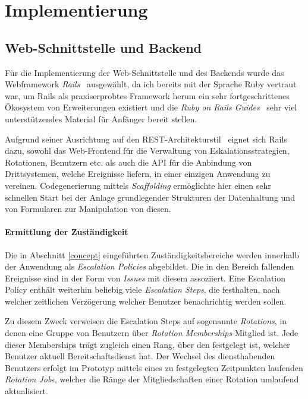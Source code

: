 \documentclass[11pt,utf8,notoc,bibnum,german,final]{zihpub}
\begin{document}
\section{Implementierung}

\subsection{Web-Schnittstelle und Backend}

Für die Implementierung der Web-Schnittstelle und des Backends wurde das
Webframework \emph{Rails}~\cite{rails} ausgewählt, da ich bereits mit der Sprache
Ruby vertraut war, um Rails als praxiserprobtes Framework herum ein sehr
fortgeschrittenes Ökosystem von Erweiterungen existiert und die \emph{Ruby on Rails
Guides}~\cite{rails-guides} sehr viel unterstützendes Material für Anfänger
bereit stellen.

Aufgrund seiner Ausrichtung auf den REST-Architekturstil~\cite{fielding-rest}
eignet sich Rails dazu, sowohl das Web-Frontend für die Verwaltung von
Eskalationsstrategien, Rotationen, Benutzern etc. als auch die API für die
Anbindung von Drittsystemen, welche Ereignisse liefern, in einer einzigen
Anwendung zu vereinen. Codegenerierung mittels \emph{Scaffolding} ermöglichte
hier einen sehr schnellen Start bei der Anlage grundlegender Strukturen der
Datenhaltung und von Formularen zur Manipulation von diesen.

\paragraph{Ermittlung der Zuständigkeit}

Die in Abschnitt \ref{concept} eingeführten Zuständigkeitsbereiche werden
innerhalb der Anwendung als \emph{Escalation Policies} abgebildet. Die in den
Bereich fallenden Ereignisse sind in der Form von \emph{Issues} mit diesem
assoziiert. Eine Escalation Policy enthält weiterhin beliebig viele
\emph{Escalation Steps}, die festhalten, nach welcher zeitlichen Verzögerung
welcher Benutzer benachrichtig werden sollen.

Zu diesem Zweck verweisen die Escalation Steps auf sogenannte \emph{Rotations},
in denen eine Gruppe von Benutzern über \emph{Rotation Memberships} Mitglied
ist. Jede dieser Memberships trägt zugleich einen Rang, über den festgelegt
ist, welcher Benutzer aktuell Bereitschaftsdienst hat. Der Wechsel des
diensthabenden Benutzers erfolgt im Prototyp mittels eines zu festgelegten
Zeitpunkten laufenden \emph{Rotation Job}s, welcher die Ränge der
Mitgliedschaften einer Rotation umlaufend aktualisiert.
\end{document}

